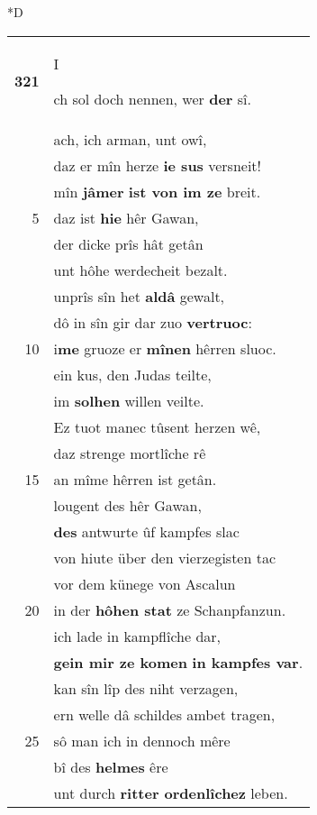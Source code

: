 \documentclass[8pt,a4paper,notitlepage]{article}
\begin{document}
\begin{table}[ht]
\begin{minipage}[t]{0.5\linewidth}
\small
\begin{center}*D
\end{center}
\begin{tabular}{rl}
\textbf{321} & \begin{large}I\end{large}ch sol doch nennen, wer \textbf{der} sî.\\ 
 & ach, ich arman, unt owî,\\ 
 & daz er mîn herze \textbf{ie sus} versneit!\\ 
 & mîn \textbf{jâmer} \textbf{ist von im ze} breit.\\ 
5 & daz ist \textbf{hie} hêr Gawan,\\ 
 & der dicke prîs hât getân\\ 
 & unt hôhe werdecheit bezalt.\\ 
 & unprîs sîn het \textbf{aldâ} gewalt,\\ 
 & dô in sîn gir dar zuo \textbf{vertruoc}:\\ 
10 & i\textbf{me} gruoze er \textbf{mînen} hêrren sluoc.\\ 
 & ein kus, den Judas teilte,\\ 
 & im \textbf{solhen} willen veilte.\\ 
 & Ez tuot manec tûsent herzen wê,\\ 
 & daz strenge mortlîche rê\\ 
15 & an mîme hêrren ist getân.\\ 
 & lougent des hêr Gawan,\\ 
 & \textbf{des} antwurte ûf kampfes slac\\ 
 & von hiute über den vierzegisten tac\\ 
 & vor dem künege von Ascalun\\ 
20 & in der \textbf{hôhen stat} ze Schanpfanzun.\\ 
 & ich lade in kampflîche dar,\\ 
 & \textbf{gein mir ze komen} \textbf{in kampfes var}.\\ 
 & kan sîn lîp des niht verzagen,\\ 
 & ern welle dâ schildes ambet tragen,\\ 
25 & sô man ich in dennoch mêre\\ 
 & bî des \textbf{helmes} êre\\ 
 & unt durch \textbf{ritter ordenlîchez} leben.\\ 

\end{tabular}
\end{minipage}
\end{table}
\end{document}
